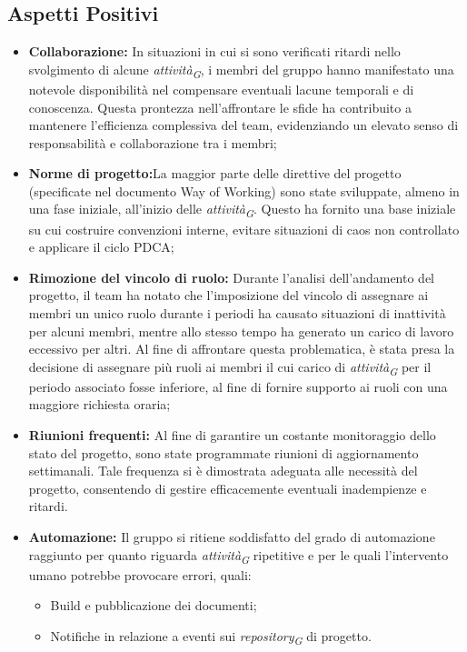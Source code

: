 \subsection{Aspetti Positivi}
\begin{itemize}
    \item \textbf{Collaborazione:} In situazioni in cui si sono verificati ritardi nello svolgimento di alcune \textit{attività}\textsubscript{\textit{G}}, i membri del gruppo hanno manifestato una notevole disponibilità nel compensare eventuali lacune temporali e di conoscenza. Questa prontezza nell'affrontare le sfide ha contribuito a mantenere l'efficienza complessiva del team, evidenziando un elevato senso di responsabilità e collaborazione tra i membri;
    \item \textbf{Norme di progetto:}La maggior parte delle direttive del progetto (specificate nel documento Way of Working) sono state sviluppate, almeno in una fase iniziale, all'inizio delle \textit{attività}\textsubscript{\textit{G}}. Questo ha fornito una base iniziale su cui costruire convenzioni interne, evitare situazioni di caos non controllato e applicare il ciclo PDCA;
    \item \textbf{Rimozione del vincolo di ruolo:} Durante l'analisi dell'andamento del progetto, il team ha notato che l'imposizione del vincolo di assegnare ai membri un unico ruolo durante i periodi ha causato situazioni di inattività per alcuni membri, mentre allo stesso tempo ha generato un carico di lavoro eccessivo per altri.
    Al fine di affrontare questa problematica, è stata presa la decisione di assegnare più ruoli ai membri il cui carico di \textit{attività}\textsubscript{\textit{G}} per il periodo associato fosse inferiore, al fine di fornire supporto ai ruoli con una maggiore richiesta oraria;
    \item \textbf{Riunioni frequenti:} Al fine di garantire un costante monitoraggio dello stato del progetto, sono state programmate riunioni di aggiornamento settimanali. Tale frequenza si è dimostrata adeguata alle necessità del progetto, consentendo di gestire efficacemente eventuali inadempienze e ritardi.
    \item \textbf{Automazione:} Il gruppo si ritiene soddisfatto del grado di automazione raggiunto per quanto riguarda \textit{attività}\textsubscript{\textit{G}} ripetitive e per le quali l'intervento umano potrebbe provocare errori, quali:
    \begin{itemize}
        \item Build e pubblicazione dei documenti;
        \item Notifiche in relazione a eventi sui \textit{repository}\textsubscript{\textit{G}} di progetto.
    \end{itemize}
\end{itemize}